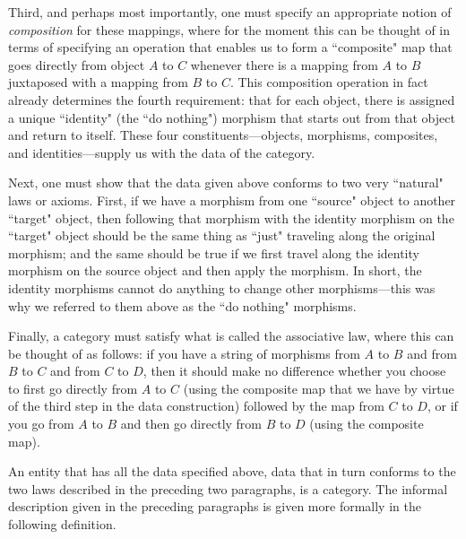 \documentclass[11pt]{book}
\theoremstyle{definition}
\theoremstyle{definition}
\theoremstyle{definition}
\theoremstyle{theorem}
\theoremstyle{definition}
\begin{document}
	Third, and perhaps most importantly, one must specify an appropriate notion of \textit{composition} for these mappings, where for the moment this can be thought of in terms of specifying an operation that enables us to form a ``composite" map that goes directly from object $A$ to $C$ whenever there is a mapping from $A$ to $B$ juxtaposed with a mapping from $B$ to $C$. This composition operation in fact already determines the fourth requirement: that for each object, there is assigned a unique ``identity" (the ``do nothing") morphism that starts out from that object and return to itself. These four constituents---objects, morphisms, composites, and identities---supply us with the data of the category. \par 
	Next, one must show that the data given above conforms to two very ``natural" laws or axioms. First, if we have a morphism from one ``source" object to another ``target" object, then following that morphism with the identity morphism on the ``target" object should be the same thing as ``just" traveling along the original morphism; and the same should be true if we first travel along the identity morphism on the source object and then apply the morphism. In short, the identity morphisms cannot do anything to change other morphisms---this was why we referred to them above as the ``do nothing" morphisms. \par 
	Finally, a category must satisfy what is called the associative law, where this can be thought of as follows: if you have a string of morphisms from $A$ to $B$ and from $B$ to $C$ and from $C$ to $D$, then it should make no difference whether you choose to first go directly from $A$ to $C$ (using the composite map that we have by virtue of the third step in the data construction) followed by the map from $C$ to $D$, or if you go from $A$ to $B$ and then go directly from $B$ to $D$ (using the composite map). \par 
	An entity that has all the data specified above, data that in turn conforms to the two laws described in the preceding two paragraphs, is a category. The informal description given in the preceding paragraphs is given more formally in the following definition. 
\end{document}

